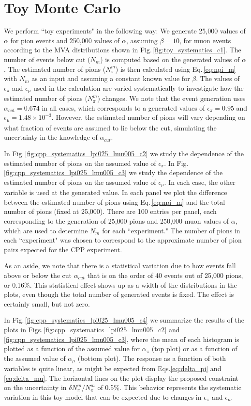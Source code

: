 \documentclass[12pt]{article}
\begin{document}
\section{Toy Monte Carlo}
We perform ``toy experiments" in the following way: We generate 25,000 values of $\alpha$ for pion events and 
250,000 values of $\alpha$, assuming $\beta=10$, for muon events according to the MVA distributions shown in Fig.\,\ref{fig:toy_systematics_c1}. The number of events below cut ($N_m$) is computed based on the generated values of $\alpha$.  The estimated number of pions ($N_\pi^m$) is then calculated using Eq.\,\ref{eq:npi_m} with $N_m$ as an input and assuming a constant known value for $\beta$. The values of $\epsilon_\pi$ and $\epsilon_\mu$ used in the calculation are varied systematically to investigate how the estimated number of pions ($N_\pi^m$) changes. We note that the event generation uses $\alpha_{cut}=0.674$ in all cases, which corresponds to a generated values of $\epsilon_\pi=0.95$ and $\epsilon_{\mu} = 1.48 \times 10^{-3}$. However, the estimated number of pions will vary depending on what fraction of events are assumed to lie below the cut, simulating the uncertainty in the knowledge of $\alpha_{cut}$. 

In Fig.\,\ref{fig:cpp_systematics_lpi025_lmu005_c2} we study the dependence of the estimated number of pions on the assumed value of $\epsilon_\pi$. In Fig.\,\ref{fig:cpp_systematics_lpi025_lmu005_c3} we study the dependence of the estimated number of pions on the assumed value of $\epsilon_\mu$. In each case, the other variable is used at the generated value.  In each panel we plot the difference between the estimated number of pions  using Eq.\,\ref{eq:npi_m} and the total number of pions (fixed at 25,000). There are 100 entries per panel, each corresponding to the generation of 25,000 pions and 250,000 muon values of $\alpha$, which are used to determine $N_m$ for each ``experiment." The number of pions in each ``experiment" was chosen to correspond to the approximate number of pion pairs expected for the CPP experiment. 

As an aside, we note that there is a statistical variation due to how events fall above or below the cut $\alpha_{cut}$ that is on the order of 40 events out of 25,000 pions, or 0.16\%.  This statistical effect shows up as a width of the distributions in the plots, even though the total number of generated events is fixed. The effect is certainly small, but not zero.

In Fig.\,\ref{fig:cpp_systematics_lpi025_lmu005_c4} we summarize the results of the plots in Figs.\,\ref{fig:cpp_systematics_lpi025_lmu005_c2} and \ref{fig:cpp_systematics_lpi025_lmu005_c3}, where the mean of each histogram is plotted as a function of the assumed value for $\alpha_\pi$ (top plot) or as a function of the assumed value of $\alpha_\mu$ (bottom plot). The response as a function of both variables is quite linear, as might be expected from Eqs.\ref{eq:delta_pi} and \ref{eq:delta_mu}. The horizontal lines on the plot display the proposed constraint on the uncertainty in $\delta N_\pi^m / N_\pi^m$ of 0.5\%. This behavior represents the systematic variation in this toy model that can be expected due to changes in $\epsilon_\pi$ and $\epsilon_\mu$.
\end{document}
